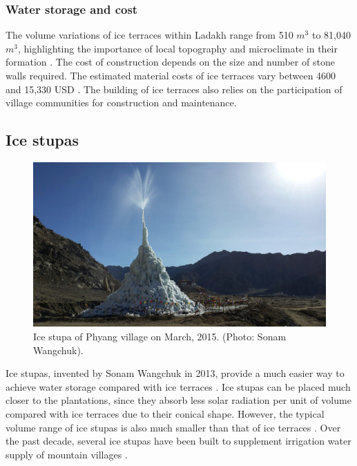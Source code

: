 \subsubsection{Water storage and cost}

The volume variations of ice terraces within Ladakh range from 510 $m^3$ to 81,040 $m^3$, highlighting
the importance of local topography and microclimate in their formation
\citep{nusserSociohydrologyArtificialGlaciers2019, norphelSnowWaterHarvesting2015}. The cost of construction
depends on the size and number of stone walls required. The estimated material costs of ice terraces vary between
4600 and 15,330 USD \citep{nusserSociohydrologyArtificialGlaciers2019}. The building of ice terraces also relies
on the participation of village communities for construction and maintenance.

\subsection{Ice stupas}

\begin{figure}[htb]
	\centering
	\includegraphics[width=\textwidth]{figs/IS_example.jpg}
	\caption{Ice stupa of Phyang village on March, 2015. (Photo: Sonam Wangchuk).}
	\label{fig:ISexample}
\end{figure}

Ice stupas, invented by Sonam Wangchuk in 2013, provide a much easier way to achieve water storage compared with
ice terraces \citep{wangchukIceStupaArtificial2014}. Ice stupas can be placed much closer to the plantations,
since they absorb less solar radiation per unit of volume compared with ice terraces due to their conical shape.
However, the typical volume range of ice stupas is also much smaller than that of ice terraces
\citep{nusserSociohydrologyArtificialGlaciers2019}. Over the past decade, several ice stupas have been built to
supplement irrigation water supply of mountain villages \citep{wangchukIceStupaCompetition2020,
palmerStoringFrozenWater2022, aggarwalAdaptationClimateChange2021}.


